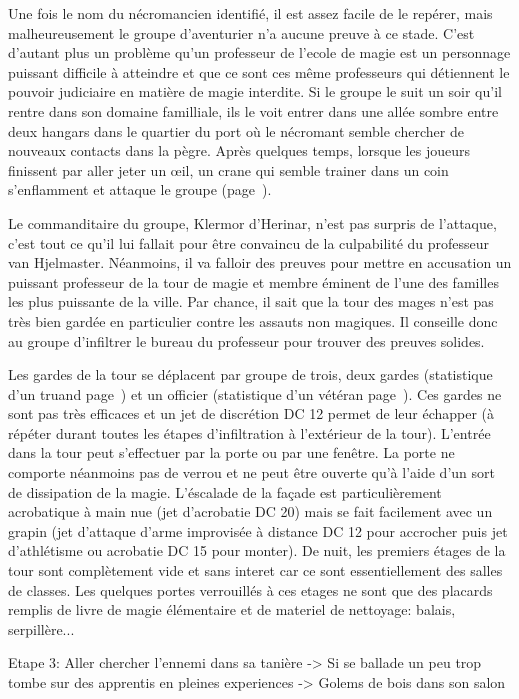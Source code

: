 Une fois le nom du nécromancien identifié, il est assez facile de le repérer, mais malheureusement le
groupe d'aventurier n'a aucune preuve à ce stade. C'est d'autant plus un problème qu'un professeur de
l'ecole de magie est un personnage puissant difficile à atteindre et que ce sont ces même professeurs
qui détiennent le pouvoir judiciaire en matière de magie interdite. Si le groupe le suit un soir qu'il
rentre dans son domaine familliale, ils le voit entrer dans une allée sombre entre deux hangars dans le 
quartier du port où le nécromant semble chercher de nouveaux contacts dans la pègre. Après quelques temps, 
lorsque les joueurs finissent par aller jeter un \oe{}il, un crane qui semble trainer dans un coin
s'enflamment et attaque le groupe (page~\pageref{CraneFlamboyant}).  

Le commanditaire du groupe, Klermor d'Herinar, n'est pas surpris de l'attaque, c'est tout ce qu'il
lui fallait pour être convaincu de la culpabilité du professeur van Hjelmaster. Néanmoins, il va falloir
des preuves pour mettre en accusation un puissant professeur de la tour de magie et membre éminent de
l'une des familles les plus puissante de la ville. Par chance, il sait que la tour des mages n'est pas 
très bien gardée en particulier contre les assauts non magiques. Il conseille donc au groupe d'infiltrer le
bureau du professeur pour trouver des preuves solides. 

Les gardes de la tour se déplacent par groupe de
trois, deux gardes (statistique d'un truand page~\pageref{Truand}) et un officier (statistique d'un
vétéran page~\pageref{Veteran}). Ces gardes ne sont pas très efficaces et un jet de discrétion DC 12
permet de leur échapper (à répéter durant toutes les étapes d'infiltration à l'extérieur de la tour). 
L'entrée dans la tour peut s'effectuer par la porte ou par une fenêtre. La porte ne comporte néanmoins 
pas de verrou et ne peut être ouverte qu'à l'aide d'un sort de dissipation de la magie. L'éscalade de la 
façade est particulièrement acrobatique à main nue (jet d'acrobatie DC 20) mais se fait facilement avec un
grapin (jet d'attaque d'arme improvisée à distance DC 12 pour accrocher puis jet d'athlétisme ou acrobatie 
DC 15 pour monter). De nuit, les premiers étages de la tour sont complètement vide et sans interet car
ce sont essentiellement des salles de classes. Les quelques portes verrouillés à ces etages ne sont que 
des placards remplis de livre de magie élémentaire et de materiel de nettoyage: balais, serpillère...

Etape 3: Aller chercher l'ennemi dans sa tanière
 -> Si se ballade un peu trop tombe sur des apprentis en pleines experiences
 -> Golems de bois dans son salon


